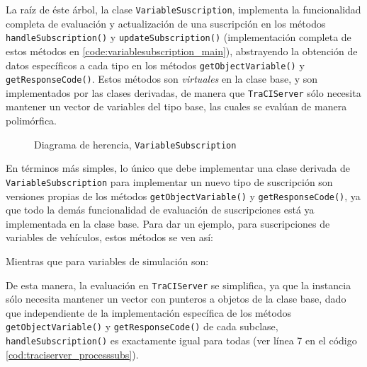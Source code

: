 La raíz de éste árbol, la clase \texttt{VariableSuscription}, implementa la funcionalidad completa de evaluación y actualización de una suscripción en los métodos \texttt{handleSubscription()} y \texttt{updateSubscription()} (implementación completa de estos métodos en \ref{code:variablesubscription_main}), abstrayendo la obtención de datos específicos a cada tipo en los métodos \texttt{getObjectVariable()} y \texttt{getResponseCode()}. Estos métodos son \emph{virtuales} en la clase base, y son implementados por las clases derivadas, de manera que \texttt{TraCIServer} sólo necesita mantener un vector de variables del tipo base, las cuales se evalúan de manera polimórfica.

\begin{figure}
    \centering
    
    \caption{Diagrama de herencia, \texttt{VariableSubscription}}
    \label{fig:cd_variablesub}
\end{figure}

En términos más simples, lo único que debe implementar una clase derivada de \texttt{VariableSubscription} para implementar un nuevo tipo de suscripción son versiones propias de los métodos \texttt{getObjectVariable()} y \texttt{getResponseCode()}, ya que todo la demás funcionalidad de evaluación de suscripciones está ya implementada en la clase base. Para dar un ejemplo, para suscripciones de variables de vehículos, estos métodos se ven así:



Mientras que para variables de simulación son:



De esta manera, la evaluación en \texttt{TraCIServer} se simplifica, ya que la instancia sólo necesita mantener un vector con punteros a objetos de la clase base, dado que independiente de la implementación específica de los métodos \texttt{getObjectVariable()} y \texttt{getResponseCode()} de cada subclase, \texttt{handleSubscription()} es exactamente igual para todas (ver línea 7 en el código \ref{cod:traciserver_processsubs}).



